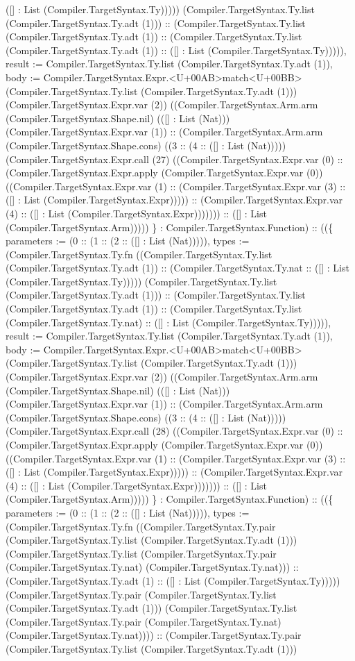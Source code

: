 \documentclass[11pt]{article}
\begin{document}
([] : List (Compiler.TargetSyntax.Ty))))) (Compiler.TargetSyntax.Ty.list (Compiler.TargetSyntax.Ty.adt (1))) :: (Compiler.TargetSyntax.Ty.list (Compiler.TargetSyntax.Ty.adt (1)) :: (Compiler.TargetSyntax.Ty.list (Compiler.TargetSyntax.Ty.adt (1)) :: ([] : List (Compiler.TargetSyntax.Ty))))), result := Compiler.TargetSyntax.Ty.list (Compiler.TargetSyntax.Ty.adt (1)), body := Compiler.TargetSyntax.Expr.<U+00AB>match<U+00BB> (Compiler.TargetSyntax.Ty.list (Compiler.TargetSyntax.Ty.adt (1))) (Compiler.TargetSyntax.Expr.var (2)) ((Compiler.TargetSyntax.Arm.arm (Compiler.TargetSyntax.Shape.nil) (([] : List (Nat))) (Compiler.TargetSyntax.Expr.var (1)) :: (Compiler.TargetSyntax.Arm.arm (Compiler.TargetSyntax.Shape.cons) ((3 :: (4 :: ([] : List (Nat))))) (Compiler.TargetSyntax.Expr.call (27) ((Compiler.TargetSyntax.Expr.var (0) :: (Compiler.TargetSyntax.Expr.apply (Compiler.TargetSyntax.Expr.var (0)) ((Compiler.TargetSyntax.Expr.var (1) :: (Compiler.TargetSyntax.Expr.var (3) :: ([] : List (Compiler.TargetSyntax.Expr))))) :: (Compiler.TargetSyntax.Expr.var (4) :: ([] : List (Compiler.TargetSyntax.Expr))))))) :: ([] : List (Compiler.TargetSyntax.Arm))))) \} : Compiler.TargetSyntax.Function) :: ((\{ parameters := (0 :: (1 :: (2 :: ([] : List (Nat))))), types := (Compiler.TargetSyntax.Ty.fn ((Compiler.TargetSyntax.Ty.list (Compiler.TargetSyntax.Ty.adt (1)) :: (Compiler.TargetSyntax.Ty.nat :: ([] : List (Compiler.TargetSyntax.Ty))))) (Compiler.TargetSyntax.Ty.list (Compiler.TargetSyntax.Ty.adt (1))) :: (Compiler.TargetSyntax.Ty.list (Compiler.TargetSyntax.Ty.adt (1)) :: (Compiler.TargetSyntax.Ty.list (Compiler.TargetSyntax.Ty.nat) :: ([] : List (Compiler.TargetSyntax.Ty))))), result := Compiler.TargetSyntax.Ty.list (Compiler.TargetSyntax.Ty.adt (1)), body := Compiler.TargetSyntax.Expr.<U+00AB>match<U+00BB> (Compiler.TargetSyntax.Ty.list (Compiler.TargetSyntax.Ty.adt (1))) (Compiler.TargetSyntax.Expr.var (2)) ((Compiler.TargetSyntax.Arm.arm (Compiler.TargetSyntax.Shape.nil) (([] : List (Nat))) (Compiler.TargetSyntax.Expr.var (1)) :: (Compiler.TargetSyntax.Arm.arm (Compiler.TargetSyntax.Shape.cons) ((3 :: (4 :: ([] : List (Nat))))) (Compiler.TargetSyntax.Expr.call (28) ((Compiler.TargetSyntax.Expr.var (0) :: (Compiler.TargetSyntax.Expr.apply (Compiler.TargetSyntax.Expr.var (0)) ((Compiler.TargetSyntax.Expr.var (1) :: (Compiler.TargetSyntax.Expr.var (3) :: ([] : List (Compiler.TargetSyntax.Expr))))) :: (Compiler.TargetSyntax.Expr.var (4) :: ([] : List (Compiler.TargetSyntax.Expr))))))) :: ([] : List (Compiler.TargetSyntax.Arm))))) \} : Compiler.TargetSyntax.Function) :: ((\{ parameters := (0 :: (1 :: (2 :: ([] : List (Nat))))), types := (Compiler.TargetSyntax.Ty.fn ((Compiler.TargetSyntax.Ty.pair (Compiler.TargetSyntax.Ty.list (Compiler.TargetSyntax.Ty.adt (1))) (Compiler.TargetSyntax.Ty.list (Compiler.TargetSyntax.Ty.pair (Compiler.TargetSyntax.Ty.nat) (Compiler.TargetSyntax.Ty.nat))) :: (Compiler.TargetSyntax.Ty.adt (1) :: ([] : List (Compiler.TargetSyntax.Ty))))) (Compiler.TargetSyntax.Ty.pair (Compiler.TargetSyntax.Ty.list (Compiler.TargetSyntax.Ty.adt (1))) (Compiler.TargetSyntax.Ty.list (Compiler.TargetSyntax.Ty.pair (Compiler.TargetSyntax.Ty.nat) (Compiler.TargetSyntax.Ty.nat)))) :: (Compiler.TargetSyntax.Ty.pair (Compiler.TargetSyntax.Ty.list (Compiler.TargetSyntax.Ty.adt (1))) 
\end{document}
